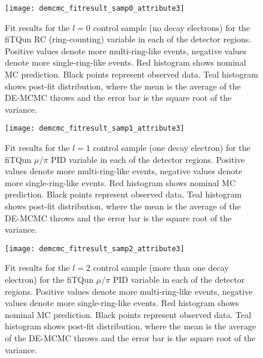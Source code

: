 \begin{figure}[h]
  \begin{center}
    \texttt{[image: demcmc\_fitresult\_samp0\_attribute3]} 
  \end{center}
  \caption{Fit results for the $l=0$ control sample (no decay electrons) for
  the fiTQun RC (ring-counting) variable in each of the detector regions.
  Positive values denote more multi-ring-like events, negative values denote
  more single-ring-like events. Red histogram shows nominal MC prediction.
  Black points represent observed data.  Teal histogram shows post-fit
  distribution, where the mean is the average of the DE-MCMC throws and the
  error bar is the square root of the variance.}
  \label{fig:fitresults_samp0_att3}
\end{figure}


\begin{figure}[h]
  \begin{center}
    \texttt{[image: demcmc\_fitresult\_samp1\_attribute3]} 
  \end{center}
  \caption{Fit results for the $l=1$ control sample (one decay electron) for
  the fiTQun $\mu/\pi$ PID variable in each of the detector regions.  Positive
  values denote more multi-ring-like events, negative values denote more
  single-ring-like events. Red histogram shows nominal MC prediction.  Black
  points represent observed data.  Teal histogram shows post-fit distribution,
  where the mean is the average of the DE-MCMC throws and the error bar is the
  square root of the variance.}
  \label{fig:fitresults_samp1_att3}
\end{figure}


\begin{figure}[h]
  \begin{center}
    \texttt{[image: demcmc\_fitresult\_samp2\_attribute3]} 
  \end{center}
  \caption{Fit results for the $l=2$ control sample (more than one decay
  electron) for the fiTQun $\mu/\pi$ PID variable in each of the detector
  regions.  Positive values denote more multi-ring-like events, negative values
  denote more single-ring-like events.  Red histogram shows nominal MC
  prediction.  Black points represent observed data.  Teal histogram shows
  post-fit distribution, where the mean is the average of the DE-MCMC throws
  and the error bar is the square root of the variance.}
  \label{fig:fitresults_samp2_att3}
\end{figure}

